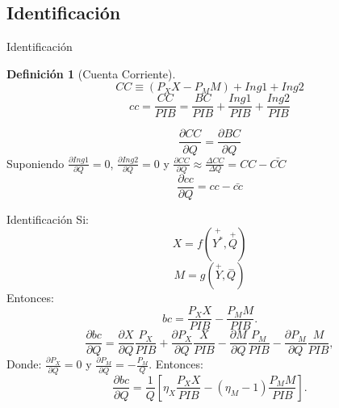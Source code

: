 \documentclass{beamer}
\newtheorem{definic}{Definición}[section]
\begin{document}
\subsection[Identificación]{Identificación}
\begin{frame}{Identificación}
\begin{definic}[Cuenta Corriente]
\begin{equation}\label{CC}
CC\equiv(P_XX-P_MM)+Ing1+Ing2
\end{equation}
\begin{equation}\label{cc}
cc=\frac{CC}{PIB}=\frac{BC}{PIB}+\frac{Ing1}{PIB}+\frac{Ing2}{PIB}
\end{equation}
\end{definic}
\begin{equation}\label{sup}
\frac{\partial CC}{\partial Q}=\frac{\partial BC}{\partial Q}
\end{equation}
Suponiendo $\frac{\partial Ing1}{\partial Q}=0$, $\frac{\partial Ing2}{\partial Q}=0$ y $\frac{\partial CC}{\partial Q}\approx \frac{\Delta CC}{\Delta Q}=CC-\bar{CC}$
\begin{equation}\label{dc}
\frac{\partial cc}{\partial Q}=cc-\bar{cc}
\end{equation}
\end{frame}

\begin{frame}{Identificación}
Si:
\begin{equation}\label{X}
X=f(\overset{+}{Y^*},\overset{+}{Q})
\end{equation}
\begin{equation}\label{M}
M=g(\overset{+}{Y},\overset{-}{Q})
\end{equation}
Entonces:
\begin{equation}
bc=\frac{P_X X}{PIB}-\frac{P_M M}{PIB}.
\end{equation}
\begin{equation}
\frac{\partial bc}{\partial Q}=\frac{\partial X}{\partial Q} \frac{P_X}{PIB}+\frac{\partial P_X}{\partial Q} \frac{X}{PIB} - \frac{\partial M}{\partial Q} \frac{P_M}{PIB}-\frac{\partial P_M}{\partial Q}\frac{M}{PIB},
\end{equation}
Donde: $\frac{\partial P_X}{\partial Q}=0$ y $\frac{\partial P_M}{\partial Q}=-\frac{P_M}{Q}$. Entonces:
\begin{equation}\label{partialq}
\frac{\partial bc}{\partial Q}=\frac{1}{Q} \left[\eta_X \frac{P_X X}{PIB}-(\eta_M -1)\frac{P_M M}{PIB}\right].
\end{equation}
\end{frame}
\end{document}
